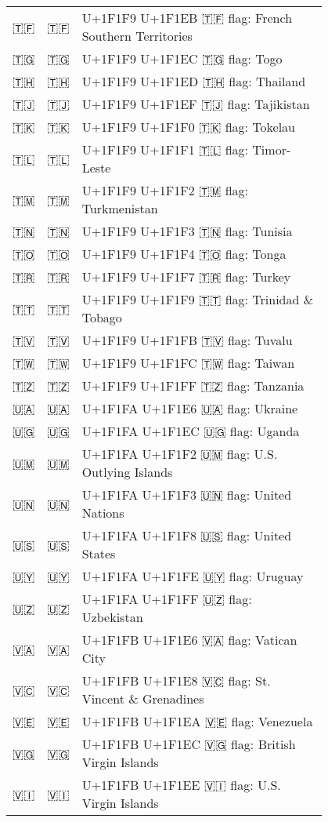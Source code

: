 \documentclass[a4paper,12pt]{article}
\newcommand{\fontA}[1]{{\fontspec[RawFeature={mode=harf,+dist,+ccmp}]{Segoe UI Emoji} #1}}
\newcommand{\fontB}[1]{{\fontspec[RawFeature={mode=harf,+dist,+ccmp}]{Noto Color Emoji} #1}}
\begin{document}
\begin{longtable}[c]{ccp{0.8\linewidth}}
\fontA{🇹🇫}&\fontB{🇹🇫}&U+1F1F9 U+1F1EB 🇹🇫 flag: French Southern Territories\\
\fontA{🇹🇬}&\fontB{🇹🇬}&U+1F1F9 U+1F1EC 🇹🇬 flag: Togo\\
\fontA{🇹🇭}&\fontB{🇹🇭}&U+1F1F9 U+1F1ED 🇹🇭 flag: Thailand\\
\fontA{🇹🇯}&\fontB{🇹🇯}&U+1F1F9 U+1F1EF 🇹🇯 flag: Tajikistan\\
\fontA{🇹🇰}&\fontB{🇹🇰}&U+1F1F9 U+1F1F0 🇹🇰 flag: Tokelau\\
\fontA{🇹🇱}&\fontB{🇹🇱}&U+1F1F9 U+1F1F1 🇹🇱 flag: Timor-Leste\\
\fontA{🇹🇲}&\fontB{🇹🇲}&U+1F1F9 U+1F1F2 🇹🇲 flag: Turkmenistan\\
\fontA{🇹🇳}&\fontB{🇹🇳}&U+1F1F9 U+1F1F3 🇹🇳 flag: Tunisia\\
\fontA{🇹🇴}&\fontB{🇹🇴}&U+1F1F9 U+1F1F4 🇹🇴 flag: Tonga\\
\fontA{🇹🇷}&\fontB{🇹🇷}&U+1F1F9 U+1F1F7 🇹🇷 flag: Turkey\\
\fontA{🇹🇹}&\fontB{🇹🇹}&U+1F1F9 U+1F1F9 🇹🇹 flag: Trinidad \& Tobago\\
\fontA{🇹🇻}&\fontB{🇹🇻}&U+1F1F9 U+1F1FB 🇹🇻 flag: Tuvalu\\
\fontA{🇹🇼}&\fontB{🇹🇼}&U+1F1F9 U+1F1FC 🇹🇼 flag: Taiwan\\
\fontA{🇹🇿}&\fontB{🇹🇿}&U+1F1F9 U+1F1FF 🇹🇿 flag: Tanzania\\
\fontA{🇺🇦}&\fontB{🇺🇦}&U+1F1FA U+1F1E6 🇺🇦 flag: Ukraine\\
\fontA{🇺🇬}&\fontB{🇺🇬}&U+1F1FA U+1F1EC 🇺🇬 flag: Uganda\\
\fontA{🇺🇲}&\fontB{🇺🇲}&U+1F1FA U+1F1F2 🇺🇲 flag: U.S. Outlying Islands\\
\fontA{🇺🇳}&\fontB{🇺🇳}&U+1F1FA U+1F1F3 🇺🇳 flag: United Nations\\
\fontA{🇺🇸}&\fontB{🇺🇸}&U+1F1FA U+1F1F8 🇺🇸 flag: United States\\
\fontA{🇺🇾}&\fontB{🇺🇾}&U+1F1FA U+1F1FE 🇺🇾 flag: Uruguay\\
\fontA{🇺🇿}&\fontB{🇺🇿}&U+1F1FA U+1F1FF 🇺🇿 flag: Uzbekistan\\
\fontA{🇻🇦}&\fontB{🇻🇦}&U+1F1FB U+1F1E6 🇻🇦 flag: Vatican City\\
\fontA{🇻🇨}&\fontB{🇻🇨}&U+1F1FB U+1F1E8 🇻🇨 flag: St. Vincent \& Grenadines\\
\fontA{🇻🇪}&\fontB{🇻🇪}&U+1F1FB U+1F1EA 🇻🇪 flag: Venezuela\\
\fontA{🇻🇬}&\fontB{🇻🇬}&U+1F1FB U+1F1EC 🇻🇬 flag: British Virgin Islands\\
\fontA{🇻🇮}&\fontB{🇻🇮}&U+1F1FB U+1F1EE 🇻🇮 flag: U.S. Virgin Islands\\

\end{longtable}
\end{document}
